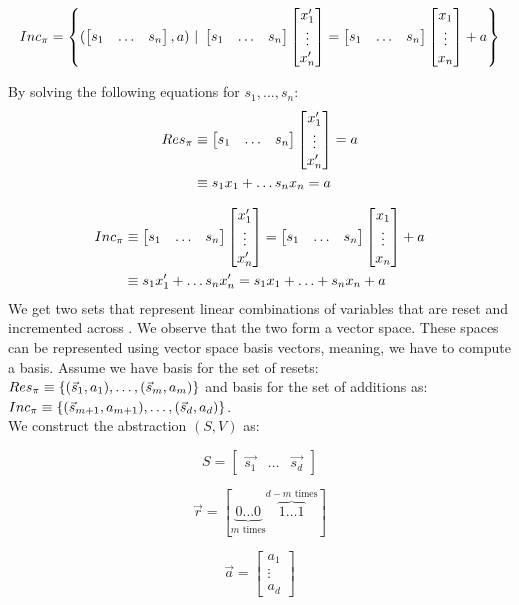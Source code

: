 \begin{equation*}
	Inc_\pi = \left\{(\begin{bmatrix} s_1 & \ldots &s_n \end{bmatrix}, a)\ |\ \begin{bmatrix} s_1 & \ldots &s_n \end{bmatrix} \begin{bmatrix} x_1' \\ \vdots \\ x_n' \end{bmatrix} = \begin{bmatrix} s_1 & \ldots &s_n \end{bmatrix} \begin{bmatrix} x_1 \\ \vdots \\ x_n \end{bmatrix} + a\right\}	
\end{equation*}
\begin{comment}
	\begin{equation*}
	Res_H = \left\{ (\s, a) | H \models \s \cdot \p = a \right\}	
	\end{equation*}
	
	\begin{equation*}
	Inc_H = \left\{(\s, a) | H \models \s \cdot \p = \s \cdot \up + a\right\}	
	\end{equation*}
\end{comment}
By solving the following equations for $s_1, \ldots, s_n$: \\
\begin{align*}
	Res_\pi &\equiv \begin{bmatrix} s_1 & \ldots &s_n \end{bmatrix} \begin{bmatrix} x_1' \\ \vdots \\ x_n' \end{bmatrix} = a \\
 			&\equiv s_1x_1 + \ldots s_nx_n = a
\end{align*}

\begin{align*}
	Inc_\trf &\equiv \sn \pn = \sn \upn + a  \\ \vspace{0.5cm}
			 &\equiv s_1x_1' + \ldots s_nx_n' = s_1x_1 + \ldots + s_nx_n + a
\end{align*}
We get two sets that represent linear combinations of variables that are reset and incremented across \trf. We observe that the two form a vector space. These spaces can be represented using vector space basis vectors, meaning, we have to compute a basis. Assume we have basis for the set of resets:
$Res_\pi \equiv \{(\vec{s}_1, a_1), \ldots, (\vec{s}_m, a_m)\}$ and basis for the set of additions as: $Inc_\pi \equiv \{(\vec{s}_{m+1}, a_{m+1}), \ldots, (\vec{s}_d, a_d)\}$. \\ We construct the \qvasr abstraction $(S, V)$ as:
\begin{center}
\begin{minipage}{0.3\linewidth}
	\begin{equation*}
		S = \begin{bmatrix} \vec{s_1} & \ldots & \vec{s_d} \end{bmatrix}
	\end{equation*}
\end{minipage}
\begin{minipage}{0.3\linewidth}
	\begin{equation*}
		\vec{r} = [ \underbrace{0 \ldots 0}_{m\text{ times}} \overbrace{1 \ldots 1}^{d - m \text{ times}} ]
	\end{equation*}
\end{minipage}
\begin{minipage}{0.3\linewidth}
	\begin{equation*}
		\vec{a} = \begin{bmatrix} a_1 \\ \vdots \\ a_d \end{bmatrix}
	\end{equation*}
\end{minipage}
\end{center}

